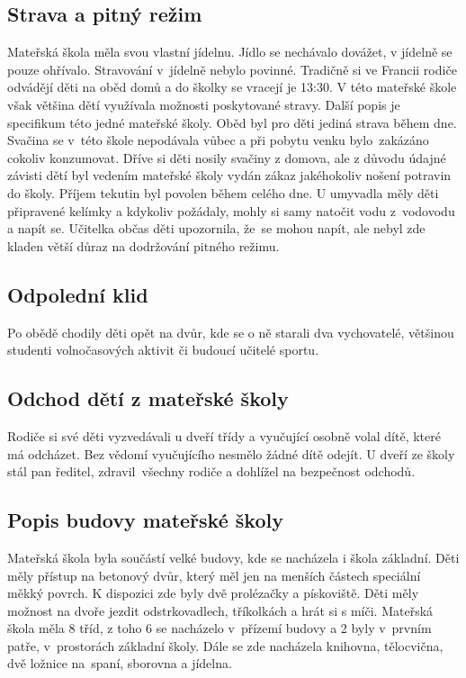 		\subsection{Strava a pitný režim}
			Mateřská škola měla svou vlastní jídelnu. Jídlo se nechávalo dovážet, v jídelně se pouze ohřívalo. Stravování v jídelně nebylo povinné. Tradičně si ve Francii rodiče odvádějí děti na oběd domů a do školky se vracejí je 13:30. V této mateřské škole však většina dětí využívala možnosti poskytované stravy. 
			Další popis je specifikum této jedné mateřské školy. Oběd byl pro děti jediná strava během dne. Svačina se v této škole nepodávala vůbec a při pobytu venku bylo zakázáno cokoliv konzumovat. Dříve si děti nosily svačiny z domova, ale z důvodu údajné závisti dětí byl vedením mateřské školy vydán zákaz jakéhokoliv nošení potravin do školy. 
			Příjem tekutin byl povolen během celého dne. U umyvadla měly děti připravené kelímky a kdykoliv požádaly, mohly si samy natočit vodu z vodovodu a napít se. Učitelka občas děti upozornila, že se mohou napít, ale nebyl zde kladen větší důraz na dodržování pitného režimu.

		\subsection{Odpolední klid}
		\label{spani}
			Po obědě chodily děti opět na dvůr, kde se o ně starali dva vychovatelé, většinou studenti volnočasových aktivit či budoucí učitelé sportu.

		\subsection{Odchod dětí z mateřské školy}
			Rodiče si své děti vyzvedávali u dveří třídy a vyučující osobně volal dítě, které má odcházet. Bez vědomí vyučujícího nesmělo žádné dítě odejít. U dveří ze školy stál pan ředitel, zdravil všechny rodiče a dohlížel na bezpečnost odchodů. 

		\subsection{Popis budovy mateřské školy}

			Mateřská škola byla součástí velké budovy, kde se nacházela i škola základní. Děti měly přístup na betonový dvůr, který měl jen na menších částech speciální měkký povrch. K dispozici zde byly dvě prolézačky a pískoviště. Děti měly možnost na dvoře jezdit odstrkovadlech, tříkolkách a hrát si s míči. 
			Mateřská škola měla 8 tříd, z toho 6 se nacházelo v přízemí budovy a 2 byly v prvním patře, v prostorách základní školy. Dále se zde nacházela knihovna, tělocvična, dvě ložnice na spaní, sborovna a jídelna. 

